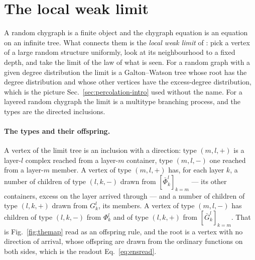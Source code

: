 \section{The local weak limit}
\label{sec:rde-local}

A random chygraph is a finite object and the chygraph equation is an
equation on an infinite tree. What connects them is the \emph{local weak
limit} of \citet{aldous2004}: pick a vertex of a large random structure
uniformly, look at its neighbourhood to a fixed depth, and take the limit of
the law of what is seen. For a random graph with a given degree distribution
the limit is a Galton--Watson tree whose root has the degree distribution
and whose other vertices have the excess-degree distribution, which is the
picture Sec.~\ref{sec:percolation-intro} used without the name. For a
layered random chygraph the limit is a multitype branching process, and the
types are the directed inclusions.

\paragraph{The types and their offspring.} A vertex of the limit tree is
an inclusion with a direction: type $(m,l,+)$ is a layer-$l$ complex reached
from a layer-$m$ container, type $(m,l,-)$ one reached from a layer-$m$
member. A vertex of type $(m,l,+)$ has, for each layer $k$, a number of
children of type $(l,k,-)$ drawn from $[\bar\Phi^{l}_{k}]_{k=m}$ --- its
other containers, excess on the layer arrived through --- and a number of
children of type $(l,k,+)$ drawn from $G^{l}_{k}$, its members. A vertex of
type $(m,l,-)$ has children of type $(l,k,-)$ from $\Phi^{l}_{k}$ and of type
$(l,k,+)$ from $[\bar G^{l}_{k}]_{k=m}$. That is Fig.~\ref{fig:themap} read
as an offspring rule, and the root is a vertex with no direction of arrival,
whose offspring are drawn from the ordinary functions on both sides, which
is the readout Eq.~\eqref{eq:ensread}.

